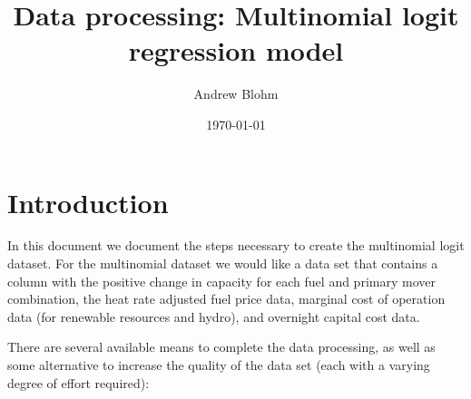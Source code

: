 \documentclass[10pt]{report}
\title{Data processing: Multinomial logit regression model}
\author{Andrew Blohm}
\date{\today}
\begin{document}
\maketitle

\chapter{Introduction}
In this document we document the steps necessary to create the multinomial logit dataset. 
For the multinomial dataset we would like a data set that contains a column with the positive change in capacity for each fuel and primary mover combination, the heat rate adjusted fuel price data, marginal cost of operation data (for renewable resources and hydro), and overnight capital cost data. 

There are several available means to complete the data processing, as well as some alternative to increase the quality of the data set (each with a varying degree of effort required):
\end{document}

